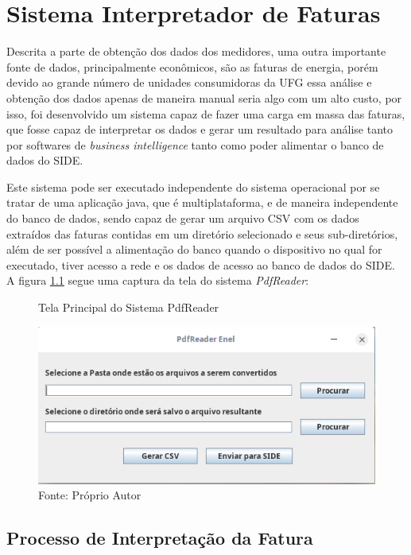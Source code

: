 \chapter{Sistema Interpretador de Faturas} 
\label{c:sistema_interpretador_de_faturas}
Descrita a parte de obtenção dos dados dos medidores, uma outra importante fonte de dados, principalmente econômicos, são as faturas de energia, porém devido ao grande número de unidades consumidoras da UFG essa análise e obtenção dos dados apenas de maneira manual seria algo com um alto custo, por isso, foi desenvolvido um sistema capaz de fazer uma carga em massa das faturas, que fosse capaz de interpretar os dados e gerar um resultado para análise tanto por softwares de \textit{business intelligence} tanto como poder alimentar o banco de dados do SIDE.

Este sistema pode ser executado independente do sistema operacional por se tratar de uma aplicação java, que é multiplataforma, e de maneira independente do banco de dados, sendo capaz de gerar um arquivo CSV com os dados extraídos das faturas contidas em um diretório selecionado e seus sub-diretórios, além de ser possível a alimentação do banco quando o dispositivo no qual for executado, tiver acesso a rede e os dados de acesso ao banco de dados do SIDE. A figura \ref{fig:pdf-reader} segue uma captura da tela do sistema \textit{PdfReader}:

\begin{figure}[H]
    \centering
    \caption{Tela Principal do Sistema PdfReader}
\includegraphics[width=\linewidth]{imagens/pdf-reader.png}
\caption*{Fonte: Próprio Autor}
\label{fig:pdf-reader}
\end{figure}

\newpage
\section{Processo de Interpretação da Fatura}

